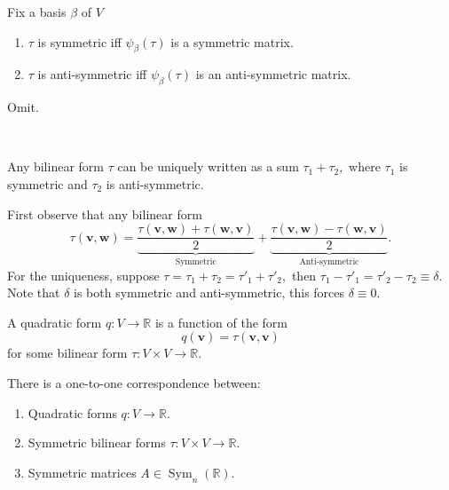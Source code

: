 \begin{theorem}
    Fix a basis $\beta$ of $V$
    \begin{enumerate}
        \item $\tau$ is symmetric iff $\psi_\beta(\tau)$ is a symmetric matrix.
        \item $\tau$ is anti-symmetric iff $\psi_\beta(\tau)$ is an anti-symmetric matrix.
    \end{enumerate}
\end{theorem}

\begin{pfbox}
    Omit.
\end{pfbox}
\

\begin{theorem}
    Any bilinear form $\tau$ can be uniquely written as a sum $\tau_1+\tau_2,$ where $\tau_1$ is symmetric and $\tau_2$ is anti-symmetric.
\end{theorem}

\begin{pfbox}
    First observe that any bilinear form 
    \[\tau(\mathbf{v}, \mathbf{w})=\underbrace{\frac{\tau(\mathbf{v},\mathbf{w})+\tau(\mathbf{w},\mathbf{v})}{2}}_{\text{Symmetric}} + \underbrace{\frac{\tau(\mathbf{v},\mathbf{w})-\tau(\mathbf{w},\mathbf{v})}{2}}_{\text{Anti-symmetric}}. \]
    For the uniqueness, suppose $\tau=\tau_1+\tau_2=\tau'_1+\tau'_2,$ then $\tau_1-\tau'_1 = \tau'_2-\tau_2 \equiv \delta.$ Note that $\delta$ is both symmetric and anti-symmetric, this forces $\delta\equiv 0.$
\end{pfbox}



\begin{definition}
A quadratic form $q:V\to\mathbb{R}$ is a function of the form
\[
q(\mathbf{v})=\tau(\mathbf{v},\mathbf{v})
\]
for some bilinear form $\tau:V\times V\to\mathbb{R}$.
\end{definition}

\begin{theorem}
There is a one-to-one correspondence between:
\begin{enumerate}
    \item Quadratic forms $q:V\to\mathbb{R}$.
    \item Symmetric bilinear forms $\tau:V\times V\to\mathbb{R}$.
    \item Symmetric matrices $A\in \operatorname{Sym}_n(\mathbb{R})$.
\end{enumerate}
\end{theorem}

